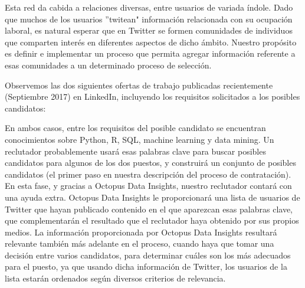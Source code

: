 Esta red da cabida a relaciones diversas, entre usuarios de variada índole. Dado que muchos de los usuarios 
''twitean" información relacionada con su ocupación laboral, es natural esperar que en Twitter 
se formen comunidades de individuos que comparten interés en diferentes aspectos de dicho ámbito.
Nuestro propósito es definir e implementar un proceso que permita agregar información referente a 
esas comunidades a un determinado proceso de selección.

Observemos las dos siguientes ofertas de trabajo publicadas recientemente (Septiembre 2017) en LinkedIn,
incluyendo los requisitos solicitados a los posibles candidatos:




En ambos casos, entre los requisitos del posible candidato se encuentran conocimientos sobre Python, R,
SQL, machine learning y data mining. Un reclutador probablemente usará esas palabras clave para buscar
posibles candidatos para algunos de los dos puestos, y construirá un conjunto de posibles candidatos (el
primer paso en nuestra descripción del proceso de contratación). En esta fase, y gracias a Octopus Data Insights,
nuestro reclutador contará con una ayuda extra. Octopus Data Insights le proporcionará una lista de usuarios
de Twitter que hayan publicado contenido en el que aparezcan esas palabras clave, que complementarán
el resultado que el reclutador haya obtenido por sus propios medios. La información proporcionada
por Octopus Data Insights resultará relevante también más adelante en el proceso,
cuando haya que tomar una decisión entre varios candidatos, para determinar cuáles son los más adecuados para el 
puesto, ya que usando dicha información de Twitter, los usuarios de la lista estarán ordenados según 
diversos criterios de relevancia.

